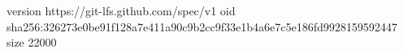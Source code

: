 version https://git-lfs.github.com/spec/v1
oid sha256:326273e0be91f128a7e411a90c9b2cc9f33e1b4a6e7c5e186fd9928159592447
size 22000
